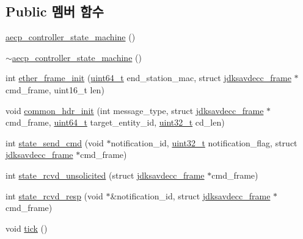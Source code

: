 \subsection*{Public 멤버 함수}
\begin{DoxyCompactItemize}
\item 
\hyperlink{classavdecc__lib_1_1aecp__controller__state__machine_a0593a9c470ab162c093d9bd2edd66afe}{aecp\+\_\+controller\+\_\+state\+\_\+machine} ()
\item 
\hyperlink{classavdecc__lib_1_1aecp__controller__state__machine_a7b4dc7c8a03a0d52146c27d7f562e0ec}{$\sim$aecp\+\_\+controller\+\_\+state\+\_\+machine} ()
\item 
int \hyperlink{classavdecc__lib_1_1aecp__controller__state__machine_a86ff947c5e6b799cfb877d3767bfa1f9}{ether\+\_\+frame\+\_\+init} (\hyperlink{parse_8c_aec6fcb673ff035718c238c8c9d544c47}{uint64\+\_\+t} end\+\_\+station\+\_\+mac, struct \hyperlink{structjdksavdecc__frame}{jdksavdecc\+\_\+frame} $\ast$cmd\+\_\+frame, uint16\+\_\+t len)
\item 
void \hyperlink{classavdecc__lib_1_1aecp__controller__state__machine_aafc737d7ed17a62fed9df6528f18d3ec}{common\+\_\+hdr\+\_\+init} (int message\+\_\+type, struct \hyperlink{structjdksavdecc__frame}{jdksavdecc\+\_\+frame} $\ast$cmd\+\_\+frame, \hyperlink{parse_8c_aec6fcb673ff035718c238c8c9d544c47}{uint64\+\_\+t} target\+\_\+entity\+\_\+id, \hyperlink{parse_8c_a6eb1e68cc391dd753bc8ce896dbb8315}{uint32\+\_\+t} cd\+\_\+len)
\item 
int \hyperlink{classavdecc__lib_1_1aecp__controller__state__machine_ab9da9129c9a77a914a7a8f9b2f291ff9}{state\+\_\+send\+\_\+cmd} (void $\ast$notification\+\_\+id, \hyperlink{parse_8c_a6eb1e68cc391dd753bc8ce896dbb8315}{uint32\+\_\+t} notification\+\_\+flag, struct \hyperlink{structjdksavdecc__frame}{jdksavdecc\+\_\+frame} $\ast$cmd\+\_\+frame)
\item 
int \hyperlink{classavdecc__lib_1_1aecp__controller__state__machine_a02520027d366c215f1e813aece78451e}{state\+\_\+rcvd\+\_\+unsolicited} (struct \hyperlink{structjdksavdecc__frame}{jdksavdecc\+\_\+frame} $\ast$cmd\+\_\+frame)
\item 
int \hyperlink{classavdecc__lib_1_1aecp__controller__state__machine_a9a29a329925ab62cdef9e98b2520bed8}{state\+\_\+rcvd\+\_\+resp} (void $\ast$\&notification\+\_\+id, struct \hyperlink{structjdksavdecc__frame}{jdksavdecc\+\_\+frame} $\ast$cmd\+\_\+frame)
\item 
void \hyperlink{classavdecc__lib_1_1aecp__controller__state__machine_a873dd91783f9efb4a590aded1f70d6b0}{tick} ()

\end{DoxyCompactItemize}
